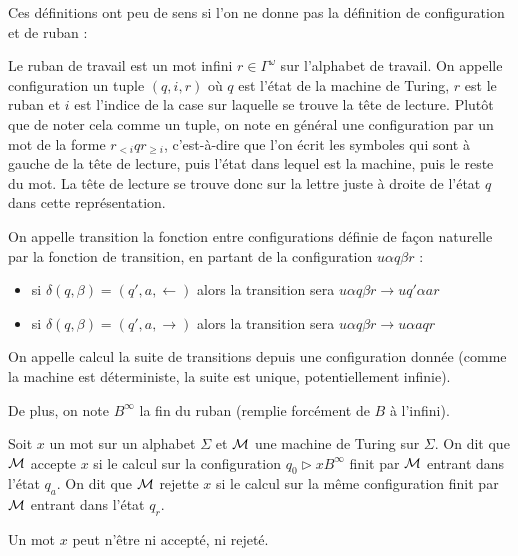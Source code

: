 Ces définitions ont peu de sens si l'on ne donne pas la définition de configuration et de ruban :

\begin{defi}
    Le ruban de travail est un mot infini $r\in \Gamma^\omega$ sur l'alphabet de travail. On appelle configuration un tuple $(q,i,r)$ où $q$ est l'état de la machine de Turing, $r$ est le ruban et $i$ est l'indice de la case sur laquelle se trouve la tête de lecture. Plutôt que de noter cela comme un tuple, on note en général une configuration par un mot de la forme $r_{<i}qr_{\geq i}$, c'est-à-dire que l'on écrit les symboles qui sont à gauche de la tête de lecture, puis l'état dans lequel est la machine, puis le reste du mot. La tête de lecture se trouve donc sur la lettre juste à droite de l'état $q$ dans cette représentation.

    On appelle transition la fonction entre configurations définie de façon naturelle par la fonction de transition, en partant de la configuration $u\alpha q\beta r$ :
    \begin{itemize}
        \item si $\delta(q,\beta) = (q',a,\leftarrow)$ alors la transition sera $u\alpha q\beta r \to uq'\alpha a r$
        \item si $\delta(q,\beta) = (q',a,\rightarrow)$ alors la transition sera $u\alpha q\beta r \to u\alpha a q r$
    \end{itemize}

    On appelle calcul la suite de transitions depuis une configuration donnée (comme la machine est déterministe, la suite est unique, potentiellement infinie).
\end{defi}

De plus, on note $B^\infty$ la fin du ruban (remplie forcément de $B$ à l'infini).

\begin{defi}
    Soit $x$ un mot sur un alphabet $\Sigma$ et $\mathcal M$ une machine de Turing sur $\Sigma$. On dit que $\mathcal M$ accepte $x$ si le calcul sur la configuration $q_0\rhd x B^\infty$ finit par $\mathcal M$ entrant dans l'état $q_a$. On dit que $\mathcal M$ rejette $x$ si le calcul sur la même configuration finit par $\mathcal M$ entrant dans l'état $q_r$.
\end{defi}

\begin{rmk}
    Un mot $x$ peut n'être ni accepté, ni rejeté.
\end{rmk}


